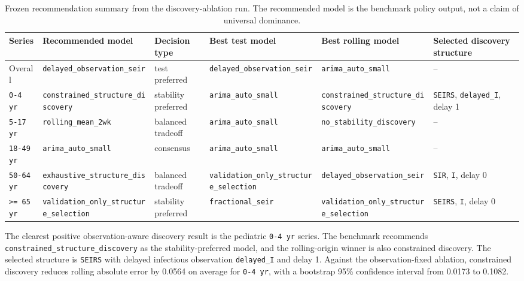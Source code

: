 \begin{table}[H]
\centering
\small
\caption{Frozen recommendation summary from the discovery-ablation run. The
recommended model is the benchmark policy output, not a claim of universal
dominance.}
\label{tab:frozen-recommendations}
\begin{tabularx}{\textwidth}{>{\raggedright\arraybackslash}p{1.35cm}
>{\raggedright\arraybackslash}p{3.1cm}
>{\raggedright\arraybackslash}p{2.25cm}
>{\raggedright\arraybackslash}p{2.8cm}
>{\raggedright\arraybackslash}p{2.8cm}
X}
\toprule
Series & Recommended model & Decision type & Best test model & Best rolling model & Selected discovery structure \\
\midrule
Overall & \texttt{delayed\_observation\_seir} & test preferred &
\texttt{delayed\_observation\_seir} & \texttt{arima\_auto\_small} & -- \\
\texttt{0-4 yr} & \texttt{constrained\_structure\_discovery} &
stability preferred & \texttt{arima\_auto\_small} &
\texttt{constrained\_structure\_discovery} &
\texttt{SEIRS}, \texttt{delayed\_I}, delay 1 \\
\texttt{5-17 yr} & \texttt{rolling\_mean\_2wk} & balanced tradeoff &
\texttt{arima\_auto\_small} & \texttt{no\_stability\_discovery} & -- \\
\texttt{18-49 yr} & \texttt{arima\_auto\_small} & consensus &
\texttt{arima\_auto\_small} & \texttt{arima\_auto\_small} & -- \\
\texttt{50-64 yr} & \texttt{exhaustive\_structure\_discovery} &
balanced tradeoff & \texttt{validation\_only\_structure\_selection} &
\texttt{delayed\_observation\_seir} & \texttt{SIR}, \texttt{I}, delay 0 \\
\texttt{>= 65 yr} & \texttt{validation\_only\_structure\_selection} &
stability preferred & \texttt{fractional\_seir} &
\texttt{validation\_only\_structure\_selection} &
\texttt{SEIRS}, \texttt{I}, delay 0 \\
\bottomrule
\end{tabularx}
\end{table}

The clearest positive observation-aware discovery result is the pediatric
\texttt{0-4 yr} series. The benchmark recommends
\texttt{constrained\_structure\_discovery} as the stability-preferred model,
and the rolling-origin winner is also constrained discovery. The selected
structure is \texttt{SEIRS} with delayed infectious observation
\texttt{delayed\_I} and delay 1. Against the observation-fixed ablation,
constrained discovery reduces rolling absolute error by \num{0.0564} on
average for \texttt{0-4 yr}, with a bootstrap 95\% confidence interval from
\num{0.0173} to \num{0.1082}.

